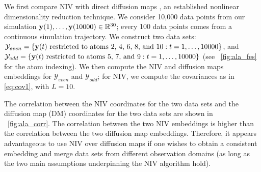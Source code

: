 We first compare NIV with direct diffusion maps \cite{coifman2005geometric}, an established nonlinear dimensionality reduction technique.
%
We consider 10,000 data points from our simulation $\mathbf{y}(1), \dots, \mathbf{y}(10000) \in \mathbb{R}^{30}$; every 100 data points comes from a continuous simulation trajectory.
%
We construct two data sets:
%
$\mathcal{Y}_{even} = \{\mathbf{y}(t) \text{ restricted to atoms 2, 4, 6, 8, and 10}: t=1, \dots, 10000 \}$,
and $\mathcal{Y}_{odd} = \{\mathbf{y}(t) \text{ restricted to atoms 5, 7, and 9}: t=1, \dots, 10000 \}$ (see \fig~\ref{fig:ala_fes} for the atom indexing).
%
We then compute the NIV and diffusion maps embeddings for $\mathcal{Y}_{even}$ and $\mathcal{Y}_{odd}$;
for NIV, we compute the covariances as in \eqref{eq:cov1}, with $L=10$.

The correlation between the NIV coordinates for the two data sets and the diffusion map (DM) coordinates for the two data sets are shown in \fig~\ref{fig:ala_corr}.
%
The correlation between the two NIV embeddings is higher than the correlation between the two diffusion map embeddings.
Therefore, it appears advantageous to use NIV over diffusion maps if one wishes to obtain a consistent embedding and merge data sets from different observation domains (as long as the two main assumptions underpinning the NIV algorithm hold).

